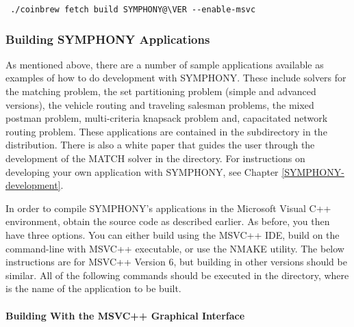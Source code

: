 {\color{brown}
\begin{verbatim}
 ./coinbrew fetch build SYMPHONY@\VER --enable-msvc
\end{verbatim}}

\subsubsection{Building SYMPHONY Applications}
\label{build_appl_msvc}

As mentioned above, there are a number of sample applications available as
examples of how to do development with SYMPHONY. These include solvers for the
matching problem, the set partitioning problem (simple and advanced versions),
the vehicle routing and traveling salesman problems, the mixed postman
problem, multi-criteria knapsack problem and, capacitated network routing
problem. These applications are contained in the 
subdirectory in the distribution. There is also a white paper that guides the
user through the development of the MATCH solver in the 
directory. For instructions on developing your own application with SYMPHONY,
see Chapter \ref{SYMPHONY-development}.

In order to compile SYMPHONY's applications in the Microsoft Visual C++
environment, obtain the source code as described earlier. As before, you then
have three options. You can either build using the MSVC++ IDE, build on the
command-line with MSVC++ executable, or use the NMAKE utility. The below
instructions are for MSVC++ Version 6, but building in other versions should
be similar. All of the following commands should be executed in the
 directory,
where  is the name of the application to be built.

\paragraph{Building With the MSVC++ Graphical Interface}

